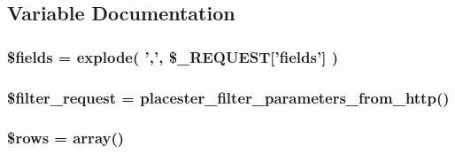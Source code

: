\subsection{Variable Documentation}
\hypertarget{properties__divbased_8php_ab2303c817e3b402b77b7f99627b9c319}{
\subsubsection[{\$fields}]{\setlength{\rightskip}{0pt plus 5cm}\$fields = explode( ',', \$\_\-REQUEST\mbox{[}'fields'\mbox{]} )}}
\label{d4/d59/properties__divbased_8php_ab2303c817e3b402b77b7f99627b9c319}
\hypertarget{properties__divbased_8php_a867e2cebab27257f0c333daace141858}{
\subsubsection[{\$filter\_\-request}]{\setlength{\rightskip}{0pt plus 5cm}\$filter\_\-request = placester\_\-filter\_\-parameters\_\-from\_\-http()}}
\label{d4/d59/properties__divbased_8php_a867e2cebab27257f0c333daace141858}
\hypertarget{properties__divbased_8php_ace2ec39e7df3899fa8df9640ec274b03}{
\subsubsection[{\$rows}]{\setlength{\rightskip}{0pt plus 5cm}\$rows = array()}}
\label{d4/d59/properties__divbased_8php_ace2ec39e7df3899fa8df9640ec274b03}
